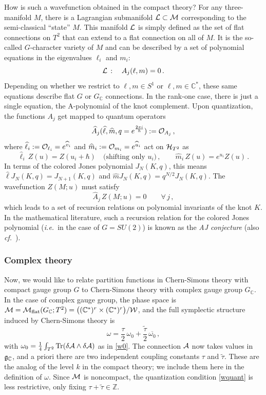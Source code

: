 \documentclass[letterpaper,12pt]{article}
\numberwithin{equation}{section}
\newcommand{\ie}{\emph{i.e.}}
\newcommand{\cf}{\emph{cf.}}
\newcommand{\ol}{\overline}
\newcommand{\be}{\begin{equation}}
\newcommand{\ee}{\end{equation}}
\newcommand{\Tr}{{\rm Tr}}
\newcommand{\C}{{\mathbb{C}}}
\newcommand{\Z}{{\mathbb{Z}}}
\newcommand{\fg}{{\frak{g}}}
\newcommand{\CA}{{\cal A}}
\newcommand{\CH}{{\cal H}}
\newcommand{\CL}{{\cal L}}
\newcommand{\CM}{{\cal M}}
\newcommand{\CO}{{\cal O}}
\newcommand{\CW}{{\cal W}}
\renewcommand{\=}{\;=\;}
\begin{document}
How is such a wavefunction obtained in the compact theory? For any three-manifold $M$, there is a Lagrangian submanifold $\CL \subset \CM$ corresponding to the semi-classical ``state'' $M$. This manifold $\CL$ is simply defined as the set of flat connections on $T^2$ that can extend to a flat connection on all of $M$. It is the so-called $G$-character variety of $M$ and can be described by a set of polynomial equations in the eigenvalues $\ell_i$ and $m_i$:
%
\be \CL\,:\quad A_j(\ell,m) = 0\,. \ee
%
Depending on whether we restrict to $\ell,m\in S^1$ or $\ell,m\in\C^*$, these same equations describe flat $G$ or $G_\C$ connections. In the rank-one case, there is just a single equation, the A-polynomial of the knot complement. Upon quantization, the functions $A_j$ get mapped to quantum operators
%
\be \widehat{A}_j(\widehat{\ell},\widehat{m},q=e^{\frac{2\pi i}{\hbar}}) := \CO_{A_j}\,,\ee
%
where $\widehat{\ell}_i :=\CO_{\ell_i} = e^{\widehat{v}_i}$
and $\widehat{m}_i :=\CO_{m_i} =e^{\widehat{u}_i}$ act on $\CH_{T^2}$ as
%
\be \widehat{\ell}_i\,Z(u) = Z(u_i+\hbar)\quad\text{(shifting only $u_i$)}\,,\qquad \widehat{m}_i\,Z(u) = e^{u_i} Z(u)\,. \ee
%
In terms of the colored Jones polynomial $J_N(K,q)$,
this means $\widehat{\ell}J_N(K,q) = J_{N+1}(K,q)$ and $\widehat{m}J_N(K,q) = q^{N/2}J_N(K,q)$.
The wavefunction $Z(M;u)$ must satisfy \cite{gukov-2003, DGLZ}
%
\be \widehat{A}_j\,Z(M;u) = 0 \qquad \forall\,j\,, \label{Acpt} \ee
%
which leads to a set of recursion relations on polynomial invariants of the knot $K$.
In the mathematical literature, such a recursion relation for the colored Jones polynomial
(\ie\ in the case of $G=SU(2)$) is known as the {\em AJ conjecture} \cite{garoufalidis-2004, Gar-Le}
(also \cf\ \cite{Gar-twist}).


\subsubsection*{Complex theory}

Now, we would like to relate partition functions in Chern-Simons theory with compact gauge group $G$ to Chern-Simons theory with complex gauge group $G_\C$. In the case of complex gauge group, the phase space is $\CM=\CM_{{\rm flat}} (G_\C;T^2)=\big((\C^*)^r\times(\C^*)^r\big)/\CW$, and the full symplectic structure induced by Chern-Simons theory is
%
\be \omega = \frac{\tau}{2}\,\omega_0 + \frac{\tilde{\tau}}{2}\,\ol{\omega_0}\,, \label{wcx} \ee
%
with $\omega_0 = \frac14\int_{T^2} \Tr(\delta \CA\wedge\delta\CA)$ as in \eqref{w0}. The connection $\CA$ now takes values in $\fg_\C$, and a priori there are two independent coupling constants $\tau$ and $\tilde{\tau}$. These are the analog of the level $k$ in the compact theory; we include them here in the definition of $\omega$. Since $\CM$ is noncompact, the quantization condition \eqref{wquant} is less restrictive, only fixing $\tau+\tilde{\tau}\in \Z$.
\end{document}
